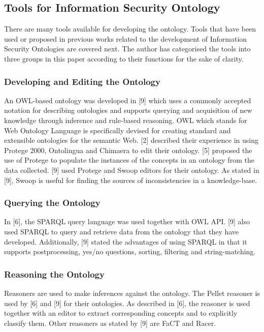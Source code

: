 \documentclass[conference, compsoc]{IEEEtran}
\begin{document}
\subsection{Tools for Information Security Ontology}
There are many tools available for developing the ontology. Tools that have been used or proposed in previous works related to the development of Information Security Ontologies are covered next. The author has categorised the tools into three groups in this paper according to their functions for the sake of clarity.

\subsubsection{Developing and Editing the Ontology}
An OWL-based ontology was developed in [9] which uses a commonly accepted notation for describing ontologies and supports querying and acquisition of new knowledge through inference and rule-based reasoning. OWL which stands for Web Ontology Language is specifically devised for creating standard and extensible ontologies for the semantic Web. [2] described their experience in using Protege 2000, Ontolingua and Chimaera to edit their ontology. [5] proposed the use of Protege to populate the instances of the concepts in an ontology from the data collected. [9] used Protege and Swoop editors for their ontology. As stated in [9], Swoop is useful for finding the sources of inconsistencies in a knowledge-base.

\subsubsection{Querying the Ontology}
In [6], the SPARQL query language was used together with OWL API. [9] also used SPARQL to query and retrieve data from the ontology that they have developed. Additionally, [9] stated the advantages of using SPARQL in that it supports postprocessing, yes/no questions, sorting, filtering and string-matching. 

\subsubsection{Reasoning the Ontology}
Reasoners are used to make inferences against the ontology. The Pellet reasoner is used by [6] and [9] for their ontologies. As described in [6], the reasoner is used together with an editor to extract corresponding concepts and to explicitly classify them. Other reasoners as stated by [9] are FaCT and Racer.
\end{document}
